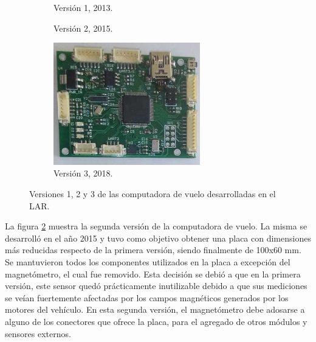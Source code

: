 %     

\begin{figure}[htb]
    \centering
    \begin{subfigure}[b]{0.48\textwidth}
        \centering
        
        \caption{Versión 1, 2013.}
        \label{fig:Choriboard_1}
    \end{subfigure}
    \begin{subfigure}[b]{0.48\textwidth}
        \centering
        
        \caption{Versión 2, 2015.}
        \label{fig:Choriboard_2}
    \end{subfigure}
    \begin{subfigure}[b]{0.48\textwidth}
        \centering
        \includegraphics[width=0.7\textwidth]{img/Choriboard_3.jpg}
        \caption{Versión 3, 2018.}
        \label{fig:Choriboard_3}
    \end{subfigure}
       \caption{Versiones 1, 2 y 3 de las computadora de vuelo desarrolladas en el LAR.}
       \label{fig:choriboards_1_2_3}
\end{figure}

La figura \ref{fig:Choriboard_2} muestra la segunda versión de la computadora de vuelo. La misma se desarrolló en el año 2015 y tuvo como objetivo obtener una placa con dimensiones más reducidas respecto de la primera versión, siendo finalmente de 100x60 mm. Se mantuvieron todos los componentes utilizados en la placa a excepción del magnetómetro, el cual fue removido. Esta decisión se debió a que en la primera versión, este sensor quedó prácticamente inutilizable debido a que sus mediciones se veían fuertemente afectadas por los campos magnéticos generados por los motores del vehículo. En esta segunda versión, el magnetómetro debe adosarse a alguno de los conectores que ofrece la placa, para el agregado de otros módulos y sensores externos.

